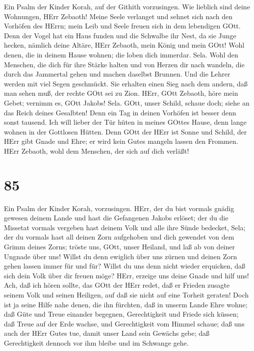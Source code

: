  Ein Psalm der Kinder Korah, auf der Githith vorzusingen.
 Wie lieblich sind deine Wohnungen, HErr Zebaoth!
 Meine Seele verlanget und sehnet sich nach den Vorhöfen des
HErrn; mein Leib und Seele freuen sich in dem lebendigen GOtt.
 Denn der Vogel hat ein Haus funden und die Schwalbe ihr
Nest, da sie Junge hecken, nämlich deine Altäre, HErr Zebaoth, mein
König und mein GOtt!  Wohl denen, die in deinem Hause
wohnen; die loben dich immerdar. Sela.  Wohl den Menschen,
die dich für ihre Stärke halten und von Herzen dir nach wandeln,
 die durch das Jammertal gehen und machen daselbst Brunnen.
Und die Lehrer werden mit viel Segen geschmückt.  Sie
erhalten einen Sieg nach dem andern, daß man sehen muß, der rechte GOtt
sei zu Zion.  HErr, GOtt Zebaoth, höre mein Gebet; vernimm
es, GOtt Jakobs! Sela.  GOtt, unser Schild, schaue doch;
siehe an das Reich deines Gesalbten!  Denn ein Tag in
deinen Vorhöfen ist besser denn sonst tausend. Ich will lieber der Tür
hüten in meines GOttes Hause, denn lange wohnen in der Gottlosen Hütten.
 Denn GOtt der HErr ist Sonne und Schild, der HErr gibt
Gnade und Ehre; er wird kein Gutes mangeln lassen den Frommen.
 HErr Zebaoth, wohl dem Menschen, der sich auf dich
verläßt!

\hypertarget{section-84}{%
\section{85}\label{section-84}}

 Ein Psalm der Kinder Korah, vorzusingen.  HErr,
der du bist vormals gnädig gewesen deinem Lande und hast die Gefangenen
Jakobs erlöset;  der du die Missetat vormals vergeben hast
deinem Volk und alle ihre Sünde bedecket, Sela;  der du
vormals hast all deinen Zorn aufgehoben und dich gewendet von dem Grimm
deines Zorns;  tröste uns, GOtt, unser Heiland, und laß ab
von deiner Ungnade über uns!  Willst du denn ewiglich über
uns zürnen und deinen Zorn gehen lassen immer für und für? 
Willst du uns denn nicht wieder erquicken, daß sich dein Volk über dir
freuen möge?  HErr, erzeige uns deine Gnade und hilf uns!
 Ach, daß ich hören sollte, das GOtt der HErr redet, daß er
Frieden zusagte seinem Volk und seinen Heiligen, auf daß sie nicht auf
eine Torheit geraten!  Doch ist ja seine Hilfe nahe denen,
die ihn fürchten, daß in unserm Lande Ehre wohne;  daß Güte
und Treue einander begegnen, Gerechtigkeit und Friede sich küssen;
 daß Treue auf der Erde wachse, und Gerechtigkeit vom
Himmel schaue;  daß uns auch der HErr Gutes tue, damit
unser Land sein Gewächs gebe;  daß Gerechtigkeit dennoch
vor ihm bleibe und im Schwange gehe.

